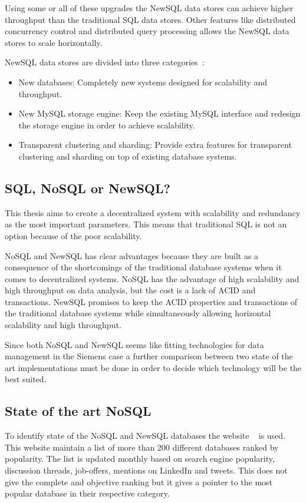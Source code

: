 Using some or all of these upgrades the NewSQL data stores can achieve higher throughput than the traditional SQL data stores.
Other features like distributed concurrency control and distributed query processing allows the NewSQL data stores to scale horizontally.

NewSQL data stores are divided into three categories~\cite{Prasanns:NewSQLTheNewWayToHandleBigData}:

\begin{itemize}
\item New databases: Completely new systems designed for scalability and throughput.
\item New MySQL storage engine: Keep the existing MySQL interface and redesign the storage engine in order to achieve scalability.
\item Transparent clustering and sharding: Provide extra features for transparent clustering and sharding on top of existing database systems. 
\end{itemize}

\subsection{SQL, NoSQL or NewSQL?}
This thesis aims to create a decentralized system with scalability and redundancy as the most important parameters.
This means that traditional SQL is not an option because of the poor scalability.

NoSQL and NewSQL has clear advantages because they are built as a consequence of the shortcomings of the traditional database systems when it comes to decentralized systems.
NoSQL has the advantage of high scalability and high throughput on data analysis, but the cost is a lack of ACID and transactions.
NewSQL promises to keep the ACID properties and transactions of the traditional database systems while simultaneously allowing horizontal scalability and high throughput.

Since both NoSQL and NewSQL seems like fitting technologies for data management in the Siemens case a further comparison between two state of the art implementations must be done in order to decide which technology will be the best suited.

\subsection{State of the art NoSQL}
To identify state of the NoSQL and NewSQL databases the website ~\cite{db-engines} is used.
This website maintain a list of more than 200 different databases ranked by popularity. The list is updated monthly based on search engine popularity, discussion threads, job-offers, mentions on LinkedIn and tweets. This does not give the complete and objective ranking but it gives a pointer to the most popular database in their respective category.

